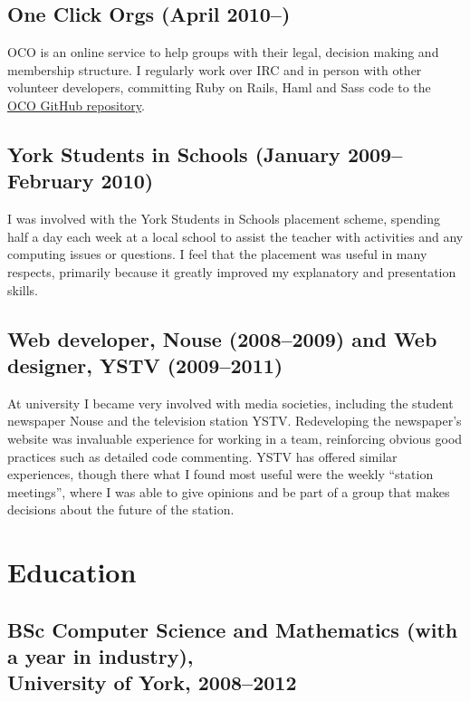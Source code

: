 \documentclass[10pt,a4paper]{article}
\begin{document}

\subsection*{One Click Orgs (April 2010--)}

OCO is an online service to help groups with their legal, decision making and
membership structure. I regularly work over IRC and in person with other
volunteer developers, committing Ruby on Rails, Haml and Sass code to the
\href{https://github.com/oneclickorgs/one-click-orgs/}{OCO GitHub repository}.

\subsection*{York Students in Schools (January 2009--February 2010)}

I was involved with the York Students in Schools placement scheme, spending
half a day each week at a local school to assist the teacher with activities
and any computing issues or questions. I feel that the placement was useful in
many respects, primarily because it greatly improved my explanatory and
presentation skills.

\subsection*{Web developer, Nouse (2008--2009) and Web designer, YSTV (2009--2011)}

At university I became very involved with media societies, including the
student newspaper Nouse and the television station YSTV. Redeveloping the
newspaper's website was invaluable experience for working in a team,
reinforcing obvious good practices such as detailed code commenting. YSTV has
offered similar experiences, though there what I found most useful were the
weekly ``station meetings'', where I was able to give opinions and be
part of a group that makes decisions about the future of the station.

\section*{Education}

\subsection*{BSc Computer Science and Mathematics (with a year in industry), \\
  University of York, 2008--2012}
\end{document}
